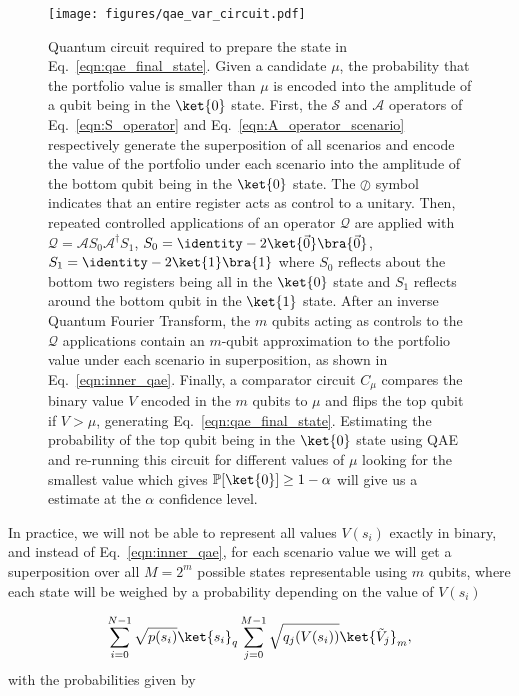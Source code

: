 \begin{enumerate}
\begin{figure}[t]
  \centering
  \texttt{[image: figures/qae\_var\_circuit.pdf]}
  \caption{Quantum circuit required to prepare the state in Eq.~\eqref{eqn:qae_final_state}. Given a \var{} candidate $\mu$, the probability that the portfolio value is smaller than $\mu$ is encoded into the amplitude of a qubit being in the $\ket{0}$ state. First, the $\mathcal{S}$ and $\mathcal{A}$ operators of Eq.~\eqref{eqn:S_operator} and Eq.~\eqref{eqn:A_operator_scenario} respectively generate the superposition of all scenarios and encode the value of the portfolio under each scenario into the amplitude of the bottom qubit being in the $\ket{0}$ state. The $\oslash$ symbol indicates that an entire register acts as control to a unitary. Then, repeated controlled applications of an operator $\mathcal{Q}$ are applied with $\mathcal{Q}=\mathcal{A} S_{0}\mathcal{A}^{\dagger}S_{1}$, $S_{0}=\identity - 2\ket{\vec{0}}\bra{\vec{0}}$, $S_1=\identity-2\ket{1}\bra{1}$ where $S_0$ reflects about the bottom two registers being all in the $\ket{0}$ state and $S_1$ reflects around the bottom qubit in the $\ket{1}$ state. After an inverse Quantum Fourier Transform, the $m$ qubits acting as controls to the $\mathcal{Q}$ applications contain an $m$-qubit approximation to the portfolio value under each scenario in superposition, as shown in Eq.~\eqref{eqn:inner_qae}. Finally, a comparator circuit $C_{\mu}$ compares the binary value $V$ encoded in the $m$ qubits to $\mu$ and flips the top qubit if $V>\mu$, generating Eq.~\eqref{eqn:qae_final_state}. Estimating the probability of the top qubit being in the $\ket{0}$ state using QAE and re-running this circuit for different values of $\mu$ looking for the smallest value which gives $\mathbb{P}[\ket{0}]\ge 1-\alpha$ will give us a \var{} estimate at the $\alpha$ confidence level.}
  \label{fig:qae_var_circuit}
\end{figure}

In practice, we will not be able to represent all values $V(s_i)$ exactly in binary, and instead of Eq.~\eqref{eqn:inner_qae}, for each scenario value we will get a superposition over all $M=2^m$ possible states representable using $m$ qubits, where each state will be weighed by a probability depending on the value of $V(s_i)$

\begin{equation}
	\label{eqn:inner_qae_superposition}
	\sum_{i=0}^{N-1}\sqrt{p(s_i)}\ket{s_i}_q\sum_{j=0}^{M-1}\sqrt{q_j(V(s_i))}\ket{\tilde{V}_j}_m,
\end{equation}
with the probabilities given by \cite{brassard2002quantum}


\end{enumerate}
